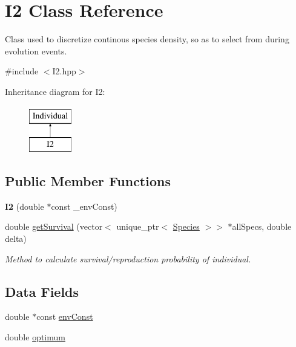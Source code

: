 \hypertarget{classI2}{}\section{I2 Class Reference}
\label{classI2}


Class used to discretize continous species density, so as to select from during evolution events.  




{\ttfamily \#include $<$I2.\+hpp$>$}

Inheritance diagram for I2\+:\begin{figure}[H]
\begin{center}
\leavevmode
\includegraphics[height=2.000000cm]{classI2}
\end{center}
\end{figure}
\subsection*{Public Member Functions}
\begin{DoxyCompactItemize}
\item 
\mbox{\label{classI2_a6b6f833683560c884852c507d489d99e}} 
{\bfseries I2} (double $\ast$const \+\_\+env\+Const)
\item 
double \hyperlink{classI2_ac747249e352a954b96a530537c60d3b1}{get\+Survival} (vector$<$ unique\+\_\+ptr$<$ \hyperlink{classSpecies}{Species} $>$$>$ $\ast$all\+Specs, double delta)
\begin{DoxyCompactList}\small\item\em Method to calculate survival/reproduction probability of individual. \end{DoxyCompactList}\end{DoxyCompactItemize}
\subsection*{Data Fields}
\begin{DoxyCompactItemize}
\item 
double $\ast$const \hyperlink{classI2_a16f94b60e5a6c02c67a46500798fd7cf}{env\+Const}
\item 
double \hyperlink{classI2_a5f022bb4d32b5ee96e117b72e17b262a}{optimum}
\end{DoxyCompactItemize}


